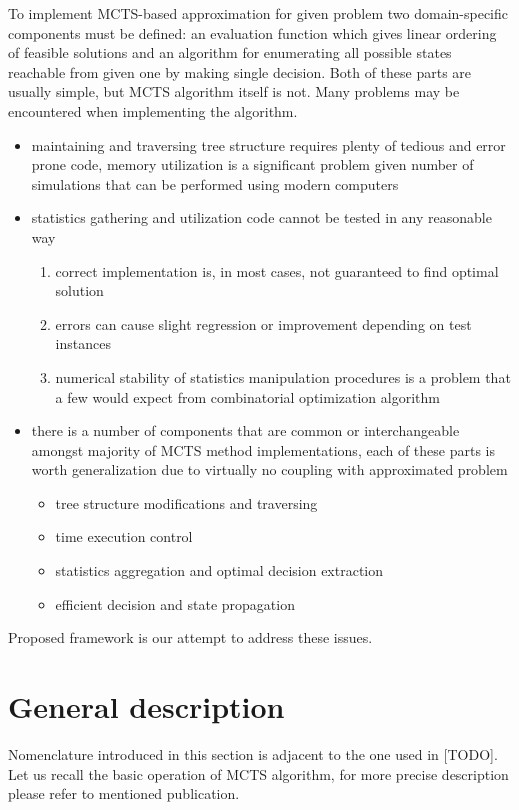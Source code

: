To implement MCTS-based approximation for given problem two domain-specific
components must be defined: an evaluation function which gives linear ordering
of feasible solutions and an algorithm for enumerating all possible states
reachable from given one by making single decision.
Both of these parts are usually simple, but MCTS algorithm itself is not. Many
problems may be encountered when implementing the algorithm.
\begin{itemize}
  \item maintaining and traversing tree structure requires plenty of tedious
    and error prone code, memory utilization is a significant problem given
    number of simulations that can be performed using modern computers
  \item statistics gathering and utilization code cannot be tested in any reasonable way
    \begin{enumerate}
      \item correct implementation is, in most cases, not guaranteed to find optimal solution
      \item errors can cause slight regression or improvement depending on test instances
      \item numerical stability of statistics manipulation procedures is a
      problem that a few would expect from combinatorial optimization algorithm
    \end{enumerate}
  \item there is a number of components that are common or interchangeable
    amongst majority of MCTS method implementations, each of these parts is
    worth generalization due to virtually no coupling with approximated problem
    \begin{itemize}
      \item tree structure modifications and traversing
      \item time execution control
      \item statistics aggregation and optimal decision extraction
      \item efficient decision and state propagation
    \end{itemize}
\end{itemize}

Proposed framework is our attempt to address these issues.

\section{General description}
Nomenclature introduced in this section is adjacent to the one used in [TODO].
Let us recall the basic operation of MCTS algorithm, for more precise
description please refer to mentioned publication.

